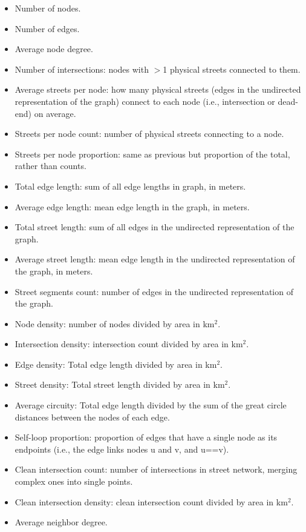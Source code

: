 \begin{itemize}
\item Number of nodes.
\item Number of edges.
\item Average node degree.
\item Number of intersections: nodes with $>$1 physical streets connected to them.
\item Average streets per node: how many physical streets (edges in the undirected representation of the graph) connect to each node (i.e., intersection or dead-end) on average.
\item Streets per node count: number of physical streets connecting to a node.
\item Streets per node proportion: same as previous but proportion of the total, rather than counts.
\item Total edge length: sum of all edge lengths in graph, in meters.
\item Average edge length: mean edge length in the graph, in meters.
\item Total street length: sum of all edges in the undirected representation of the graph.
\item Average street length: mean edge length in the undirected representation of the graph, in meters.
\item Street segments count: number of edges in the undirected representation of the graph.
\item Node density: number of nodes divided by area in km$^2$.
\item Intersection density: intersection count divided by area in km$^2$.
\item Edge density: Total edge length divided by area in km$^2$.
\item Street density: Total street length divided by area in km$^2$.
\item Average circuity: Total edge length divided by the sum of the great circle distances between the nodes of each edge.
\item Self-loop proportion: proportion of edges that have a single node as its endpoints (i.e., the edge links nodes u and v, and u==v).
\item Clean intersection count: number of intersections in street network, merging complex ones into single points.
\item Clean intersection density: clean intersection count divided by area in km$^2$.
\item Average neighbor degree.

\end{itemize}
